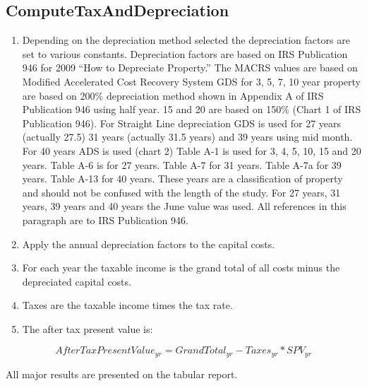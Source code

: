 \subsection{ComputeTaxAndDepreciation}\label{computetaxanddepreciation}

\begin{enumerate}
\def\labelenumi{Step~\arabic{enumi}.}
\item Depending on the depreciation method selected the depreciation factors are set to various constants. Depreciation factors are based on IRS Publication 946 for 2009 ``How to Depreciate Property.'' The MACRS values are based on Modified Accelerated Cost Recovery System GDS for 3, 5, 7, 10 year property are based on 200\% depreciation method shown in Appendix A of IRS Publication 946 using half year. 15 and 20 are based on 150\% (Chart 1 of IRS Publication 946). For Straight Line depreciation GDS is used for 27 years (actually 27.5) 31 years (actually 31.5 years) and 39 years using mid month. For 40 years ADS is used (chart 2) Table A-1 is used for 3, 4, 5, 10, 15 and 20 years. Table A-6 is for 27 years. Table A-7 for 31 years. Table A-7a for 39 years. Table A-13 for 40 years. These years are a classification of property and should not be confused with the length of the study. For 27 years, 31 years, 39 years and 40 years the June value was used. All references in this paragraph are to IRS Publication 946.
\item Apply the annual depreciation factors to the capital costs.
\item For each year the taxable income is the grand total of all costs minus the depreciated capital costs.
\item Taxes are the taxable income times the tax rate.
\item The after tax present value is:
\end{enumerate}

\begin{equation}
AfterTaxPresentValue_{yr} = GrandTotal_{yr} - Taxes_{yr} * SPV_{yr}
\end{equation}

All major results are presented on the tabular report.
